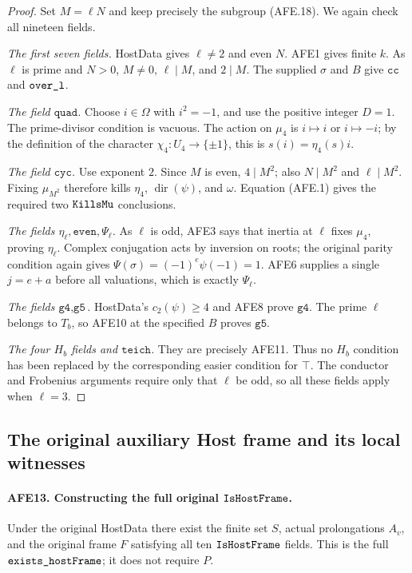 \documentclass[11pt,a4paper]{article}
\numberwithin{equation}{section}
\theoremstyle{remark}\newtheorem{remark}[theorem]{Remark}
\begin{document}
\begin{proof}
Set \(M=\ell N\) and keep precisely the subgroup
(AFE.18).  We again check all nineteen fields.

\emph{The first seven fields.}
HostData gives \(\ell\ne2\) and even \(N\).
AFE1 gives finite \(k\).
As \(\ell\) is prime and \(N>0\),
\(M\ne0\), \(\ell\mid M\), and \(2\mid M\).
The supplied \(\sigma\) and \(B\) give
\(\texttt{cc}\) and \(\texttt{over\_\allowbreak l}\).

\emph{The field \(\texttt{quad}\).}
Choose \(i\in\Omega\) with \(i^2=-1\), and use the
positive integer \(D=1\).
The prime-divisor condition is vacuous.
The action on \(\mu_4\) is \(i\mapsto i\) or
\(i\mapsto-i\); by the definition of the character
\(\chi_4:U_4\to\{\pm1\}\), this is
\(s(i)=\eta_4(s)i\).

\emph{The field \(\texttt{cyc}\).}
Use exponent \(2\).
Since \(M\) is even, \(4\mid M^2\);
also \(N\mid M^2\) and \(\ell\mid M^2\).
Fixing \(\mu_{M^2}\) therefore kills \(\eta_4\),
\(\operatorname{dir}(\psi)\), and \(\omega\).
Equation (AFE.1) gives the required two
\(\texttt{Kills\allowbreak Mu}\) conclusions.

\emph{The fields \(\eta_\ell,\texttt{even},\Psi_\ell\).}
As \(\ell\) is odd, AFE3 says that inertia at
\(\ell\) fixes \(\mu_4\), proving \(\eta_\ell\).
Complex conjugation acts by inversion on roots;
the original parity condition again gives
\(\Psi(\sigma)=(-1)^e\psi(-1)=1\).
AFE6 supplies a single \(j=e+a\) before all
valuations, which is exactly \(\Psi_\ell\).

\emph{The fields \(\texttt{g4},\texttt{g5}\).}
HostData's \(c_2(\psi)\ge4\) and AFE8 prove
\(\texttt{g4}\).
The prime \(\ell\) belongs to \(T_b\), so AFE10
at the specified \(B\) proves \(\texttt{g5}\).

\emph{The four \(H_b\) fields and \(\texttt{teich}\).}
They are precisely AFE11.
Thus no \(H_b\) condition has been replaced by the
corresponding easier condition for \(\top\).
The conductor and Frobenius arguments require only
that \(\ell\) be odd, so all these fields apply when
\(\ell=3\).
\end{proof}

\subsection{The original auxiliary Host frame and its local witnesses}

\paragraph{AFE13. Constructing the full original \(\texttt{Is\allowbreak Host\allowbreak Frame}\).}
\label{claim:AFE13}
Under the original HostData there exist the finite
set \(S\), actual prolongations \(A_v\), and the
original frame \(F\) satisfying all ten
\(\texttt{Is\allowbreak Host\allowbreak Frame}\) fields.
This is the full \(\texttt{exists\_\allowbreak host\allowbreak Frame}\);
it does not require \(P\).
\end{document}

